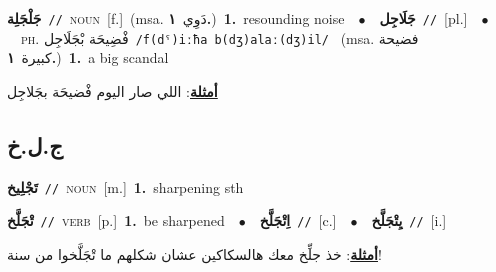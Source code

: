 \documentclass[10pt,a4paper,twoside]{article} %
\begin{document}
\begin{multicols}{2}
{\setlength\topsep{0pt}\textbf{\foreignlanguage{arabic}{جَلْجَلِة}}\ {\color{gray}\texttt{//}\color{black}}\ \textsc{noun}\ [f.]\ \color{gray}(msa. \foreignlanguage{arabic}{دَوِي}~\foreignlanguage{arabic}{\textbf{١.}})\color{black}\ \textbf{1.}~resounding noise\ \ $\bullet$\ \ \setlength\topsep{0pt}\textbf{\foreignlanguage{arabic}{جَلَاجِل}}\ {\color{gray}\texttt{//}\color{black}}\ [pl.]\ \ $\bullet$\ \ \textsc{ph.} \color{gray} \foreignlanguage{arabic}{فْضِيحَة بْجَلَاجِل}\color{black}\ {\color{gray}\texttt{/{\sffamily f(dˤ)iːħa b(dʒ)alaː(dʒ)il}/}\color{black}}\ \color{gray} (msa. \foreignlanguage{arabic}{فضيحة كبيرة}~\foreignlanguage{arabic}{\textbf{١.}})\color{black}\ \textbf{1.}~a big scandal\  \begin{flushright}\color{gray}\foreignlanguage{arabic}{\textbf{\underline{\foreignlanguage{arabic}{أمثلة}}}: اللي صار اليوم فْضيحَة بجَلاجِل}\end{flushright}\color{black}} \vspace{2mm}

\vspace{-3mm}
\subsection*{\color{blue}\foreignlanguage{arabic}{ج.ل.خ}\color{blue}{}} 

{\setlength\topsep{0pt}\textbf{\foreignlanguage{arabic}{تَجْلِيخ}}\ {\color{gray}\texttt{//}\color{black}}\ \textsc{noun}\ [m.]\ \textbf{1.}~sharpening sth\ } \vspace{2mm}

{\setlength\topsep{0pt}\textbf{\foreignlanguage{arabic}{تْجَلَّخ}}\ {\color{gray}\texttt{//}\color{black}}\ \textsc{verb}\ [p.]\ \textbf{1.}~be sharpened\ \ $\bullet$\ \ \setlength\topsep{0pt}\textbf{\foreignlanguage{arabic}{اِتْجَلَّخ}}\ {\color{gray}\texttt{//}\color{black}}\ [c.]\ \ $\bullet$\ \ \setlength\topsep{0pt}\textbf{\foreignlanguage{arabic}{يِتْجَلَّخ}}\ {\color{gray}\texttt{//}\color{black}}\ [i.]\  \begin{flushright}\color{gray}\foreignlanguage{arabic}{\textbf{\underline{\foreignlanguage{arabic}{أمثلة}}}: خذ جلِّخ معك هالسكاكين عشان شكلهم ما تْجَلَّخوا من سنة!}\end{flushright}\color{black}} \vspace{2mm}


\end{multicols}
\end{document}
